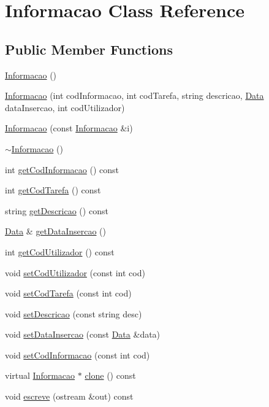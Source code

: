 \hypertarget{class_informacao}{\section{Informacao Class Reference}
\label{class_informacao}
}
\subsection*{Public Member Functions}
\begin{DoxyCompactItemize}
\item 
\hyperlink{class_informacao_a5149ad8e568096a238ef19642c4d0a0f}{Informacao} ()
\item 
\hyperlink{class_informacao_ad5f6f2921f5390382c6d4137846a7a1b}{Informacao} (int cod\-Informacao, int cod\-Tarefa, string descricao, \hyperlink{class_data}{Data} data\-Insercao, int cod\-Utilizador)
\item 
\hyperlink{class_informacao_aab79e77f14d843ec13b23cc9079fd575}{Informacao} (const \hyperlink{class_informacao}{Informacao} \&i)
\item 
\hyperlink{class_informacao_aaedc8b8b9eb880bb713308ed29a001b2}{$\sim$\-Informacao} ()
\item 
int \hyperlink{class_informacao_a72fbe20c40ef5b30e8e0037fee3b98fc}{get\-Cod\-Informacao} () const 
\item 
int \hyperlink{class_informacao_a2526d46f7ab37e8b2824ed37b38ae2de}{get\-Cod\-Tarefa} () const 
\item 
string \hyperlink{class_informacao_a7bc8378f81491e470219a163a801b912}{get\-Descricao} () const 
\item 
\hyperlink{class_data}{Data} \& \hyperlink{class_informacao_a235284db0031ae0e40b6ff33ac570d3a}{get\-Data\-Insercao} ()
\item 
int \hyperlink{class_informacao_af75de643cbf589201d89ca12a747c58a}{get\-Cod\-Utilizador} () const 
\item 
void \hyperlink{class_informacao_aa5dc462c6329b0382d2663fa2feb60fe}{set\-Cod\-Utilizador} (const int cod)
\item 
void \hyperlink{class_informacao_ae85d359e922a4515970a6193592c0e59}{set\-Cod\-Tarefa} (const int cod)
\item 
void \hyperlink{class_informacao_a4aa5326c258c9876fb2f22eaa21baad4}{set\-Descricao} (const string desc)
\item 
void \hyperlink{class_informacao_a2045093bc46e876d4e8892bff0a1c73b}{set\-Data\-Insercao} (const \hyperlink{class_data}{Data} \&data)
\item 
void \hyperlink{class_informacao_a4823ef0549bec71d547ff4d896054a20}{set\-Cod\-Informacao} (const int cod)
\item 
virtual \hyperlink{class_informacao}{Informacao} $\ast$ \hyperlink{class_informacao_a1d1a4fcd127b67a4cb70b19437afd869}{clone} () const 
\item 
void \hyperlink{class_informacao_acd78ce6161f6163077ab9e419b31fd39}{escreve} (ostream \&out) const 
\end{DoxyCompactItemize}


